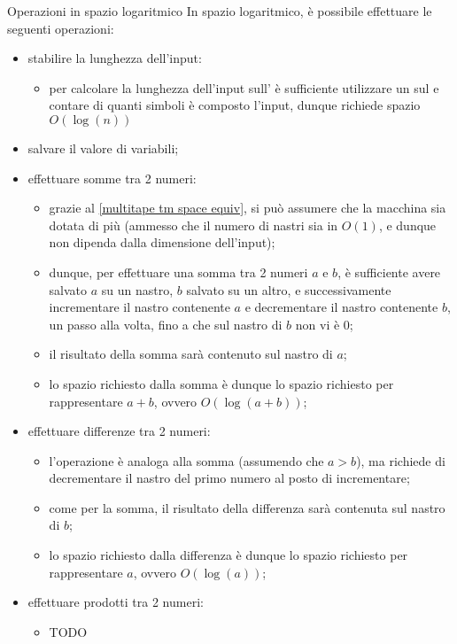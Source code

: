 \documentclass[a4paper, 12pt]{report}
\begin{document}
    \begin{framedprop}[label={log space ops}, breakable]{Operazioni in spazio logaritmico}
        In spazio logaritmico, è possibile effettuare le seguenti operazioni:

        \begin{itemize}
            \item stabilire la lunghezza dell'input:
                \begin{itemize}
                    \item per calcolare la lunghezza dell'input sull' è sufficiente utilizzare un sul  e contare di quanti simboli è composto l'input, dunque richiede spazio $O(\log(n))$
                \end{itemize}
            \item salvare il valore di variabili;
            \item effettuare somme tra 2 numeri:
                \begin{itemize}
                    \item grazie al \cref{multitape tm space equiv}, si può assumere che la macchina sia dotata di più  (ammesso che il numero di nastri sia in $O(1)$, e dunque non dipenda dalla dimensione dell'input);
                    \item dunque, per effettuare una somma tra 2 numeri $a$ e $b$, è sufficiente avere salvato $a$ su un nastro, $b$ salvato su un altro, e successivamente incrementare il nastro contenente $a$ e decrementare il nastro contenente $b$, un passo alla volta, fino a che sul nastro di $b$ non vi è 0;
                    \item il risultato della somma sarà contenuto sul nastro di $a$;
                    \item lo spazio richiesto dalla somma è dunque lo spazio richiesto per rappresentare $a + b$, ovvero $O(\log(a + b))$;
                \end{itemize}
            \item effettuare differenze tra 2 numeri:
                \begin{itemize}
                    \item l'operazione è analoga alla somma (assumendo che $a > b$), ma richiede di decrementare il nastro del primo numero al posto di incrementare;
                    \item come per la somma, il risultato della differenza sarà contenuta sul nastro di $b$;
                    \item lo spazio richiesto dalla differenza è dunque lo spazio richiesto per rappresentare $a$, ovvero $O(\log(a))$;
                \end{itemize}
            \item effettuare prodotti tra 2 numeri:
                \begin{itemize}
                    \item TODO
                \end{itemize}
        \end{itemize}
    \end{framedprop}
\end{document}
